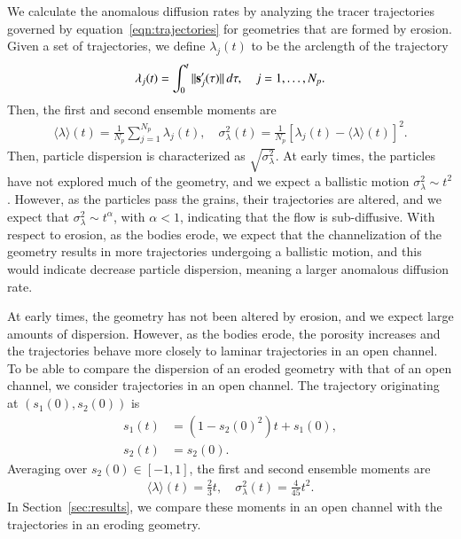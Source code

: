 \documentclass[preprint, 10pt]{elsarticle}
\begin{document}
We calculate the anomalous diffusion rates by analyzing the tracer
trajectories governed by equation~\eqref{eqn:trajectories} for
geometries that are formed by erosion.  Given a set of trajectories, we
define $\lambda_j(t)$ to be the arclength of the trajectory
\begin{align}
  \lambda_j(t) = \int_{0}^t \|\ss'_j(\tau)\|\, d\tau, 
    \quad j=1,\ldots,N_p.
\end{align}
Then, the first and second ensemble moments are
\begin{align}
  \langle \lambda \rangle (t) = 
    \frac{1}{N_p} \sum_{j=1}^{N_p} \lambda_j(t), \quad 
    \sigma_\lambda^2(t) = \frac{1}{N_p} 
    \left[\lambda_j(t) - \langle \lambda \rangle(t) \right]^2.
\end{align}
Then, particle dispersion is characterized as $\sqrt{\sigma_\lambda^2}$.
At early times, the particles have not explored much of the geometry,
and we expect a ballistic motion $\sigma_\lambda^2 \sim t^2$.  However,
as the particles pass the grains, their trajectories are altered, and we
expect that $\sigma_\lambda^2 \sim t^\alpha$, with $\alpha < 1$,
indicating that the flow is sub-diffusive.  With respect to erosion, as
the bodies erode, we expect that the channelization of the geometry
results in more trajectories undergoing a ballistic motion, and this
would indicate decrease particle dispersion, meaning a larger anomalous
diffusion rate.

At early times, the geometry has not been altered by erosion, and we
expect large amounts of dispersion.  However, as the bodies erode, the
porosity increases and the trajectories behave more closely to laminar
trajectories in an open channel.  To be able to compare the dispersion
of an eroded geometry with that of an open channel, we consider
trajectories in an open channel.  The trajectory originating at
$(s_1(0),s_2(0))$ is
\begin{align}
  s_1(t) &= (1-s_2(0)^2)t + s_1(0), \\
  s_2(t) &= s_2(0).
\end{align}
Averaging over $s_2(0) \in [-1,1]$, the first and second ensemble
moments are
\begin{align}
  \langle \lambda \rangle (t) = \frac{2}{3}t, \quad 
    \sigma_\lambda^2(t) = \frac{4}{45}t^2.
\end{align}
In Section~\ref{sec:results}, we compare these moments in an open
channel with the trajectories in an eroding geometry.


\end{document}

